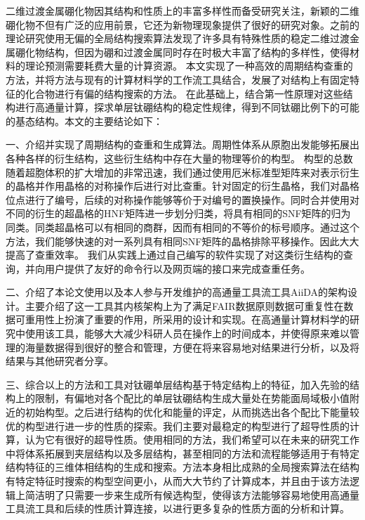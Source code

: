 \documentclass[phd,nobackinfo]{scutthesis}
\begin{document}










\begin{conclusion}\label{chapter_concludes}

二维过渡金属硼化物因其结构和性质上的丰富多样性而备受研究关注，新颖的二维硼化物不但有广泛的应用前景，它还为新物理现象提供了很好的研究对象。之前的理论研究使用无偏的全局结构搜索算法发现了许多具有特殊性质的稳定二维过渡金属硼化物结构，但因为硼和过渡金属同时存在时极大丰富了结构的多样性，使得材料的理论预测需要耗费大量的计算资源。
本文实现了一种高效的周期结构查重的方法，并将方法与现有的计算材料学的工作流工具结合，发展了对结构上有固定特征的化合物进行有偏的结构搜索的方法。
在此基础上，结合第一性原理对这些结构进行高通量计算，探求单层钛硼结构的稳定性规律，得到不同钛硼比例下的可能的基态结构。本文的主要结论如下：

一、介绍并实现了周期结构的查重和生成算法。周期性体系从原胞出发能够拓展出各种各样的衍生结构，这些衍生结构中存在大量的物理等价的构型。
构型的总数随着超胞体积的扩大增加的非常迅速，我们通过使用厄米标准型矩阵来对表示衍生的晶格并作用晶格的对称操作后进行对比查重。针对固定的衍生晶格，我们对晶格位点进行了编号，后续的对称操作能够等价于对编号的置换操作。同时合并使用对不同的衍生的超晶格的HNF矩阵进一步划分归类，将具有相同的SNF矩阵的归为同类。同类超晶格可以有相同的商群，因而有相同的不等价的标号顺序。通过这个方法，我们能够快速的对一系列具有相同SNF矩阵的晶格排除平移操作。因此大大提高了查重效率。
我们从实践上通过自己编写的软件实现了对这类衍生结构的查询，并向用户提供了友好的命令行以及网页端的接口来完成查重任务。

二、介绍了本论文使用以及本人参与开发维护的高通量工具流工具AiiDA的架构设计。主要介绍了这一工具其内核架构上为了满足FAIR数据原则数据可重复性在数据可重用性上扮演了重要的作用，所采用的设计和实现。在高通量计算材料学的研究中使用该工具，能够大大减少科研人员在操作上的时间成本，并使得原来难以管理的海量数据得到很好的整合和管理，方便在将来容易地对结果进行分析，以及将结果与其他研究者分享。

三、综合以上的方法和工具对钛硼单层结构基于特定结构上的特征，加入先验的结构上的限制，有偏地对各个配比的单层钛硼结构生成大量处在势能面局域极小值附近的初始构型。之后进行结构的优化和能量的评定，从而挑选出各个配比下能量较优的构型进行进一步的性质的探索。我们主要对最稳定的构型进行了超导性质的计算，认为它有很好的超导性质。使用相同的方法，我们希望可以在未来的研究工作中将体系拓展到夹层结构以及多层结构，甚至相同的方法和流程能够适用于有特定结构特征的三维体相结构的生成和搜索。方法本身相比成熟的全局搜索算法在结构有特定特征时搜索的构型空间更小，从而大大节约了计算成本，并且由于该方法逻辑上简洁明了只需要一步来生成所有候选构型，使得该方法能够容易地使用高通量工具流工具和后续的性质计算连接，以进行更多复杂的性质方面的分析和计算。

\end{conclusion}
\end{document}
